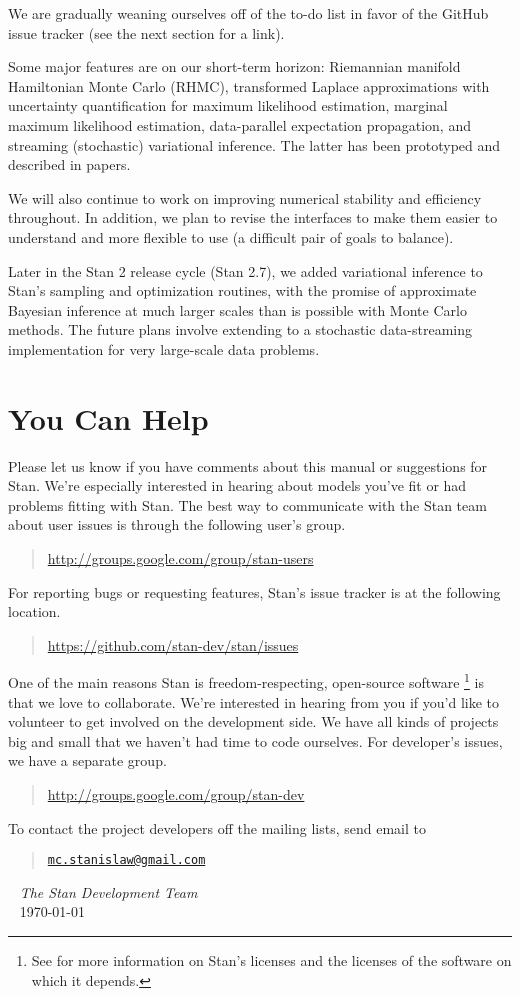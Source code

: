 %
We are gradually weaning ourselves off of the to-do list in favor of
the GitHub issue tracker (see the next section for a link).

Some major features are on our short-term horizon: Riemannian manifold
Hamiltonian Monte Carlo (RHMC), transformed Laplace approximations
with uncertainty quantification for maximum likelihood estimation,
marginal maximum likelihood estimation, data-parallel expectation
propagation, and streaming (stochastic) variational inference.  The
latter has been prototyped and described in papers. 

We will also continue to work on improving numerical stability and
efficiency throughout.  In addition, we plan to revise the interfaces
to make them easier to understand and more flexible to use (a
difficult pair of goals to balance).

Later in the Stan 2 release cycle (Stan 2.7), we added variational
inference to Stan's sampling and optimization routines, with the
promise of approximate Bayesian inference at much larger scales than
is possible with Monte Carlo methods.  The future plans involve
extending to a stochastic data-streaming implementation for very
large-scale data problems.



\section*{You Can Help}

Please let us know if you have comments about this manual or
suggestions for Stan.  We're especially interested in hearing about
models you've fit or had problems fitting with Stan.  The best way to
communicate with the Stan team about user issues is through the
following user's group.
%
\begin{quote}
\url{http://groups.google.com/group/stan-users}
\end{quote}
%
For reporting bugs or requesting features, Stan's issue tracker is at
the following location.
%
\begin{quote}
\url{https://github.com/stan-dev/stan/issues}
\end{quote}

One of the main reasons Stan is freedom-respecting, open-source
software%
%
\footnote{See  for more information on Stan's
  licenses and the licenses of the software on which it depends.}
%
is that we love to collaborate.  We're interested in hearing
from you if you'd like to volunteer to get involved on the development
side.  We have all kinds of projects big and small that we haven't had
time to code ourselves.  For developer's issues, we have a separate
group.
%
\begin{quote}
\url{http://groups.google.com/group/stan-dev}
\end{quote}

To contact the project developers off the mailing lists, send email to
\begin{quote}
\href{mailto:mc.stanislaw@gmail.com}{\nolinkurl{mc.stanislaw@gmail.com}}
\end{quote}

\vspace*{12pt}
\mbox{ } \hfill {\it The Stan Development Team}
\\
\mbox{ } \hfill \today
